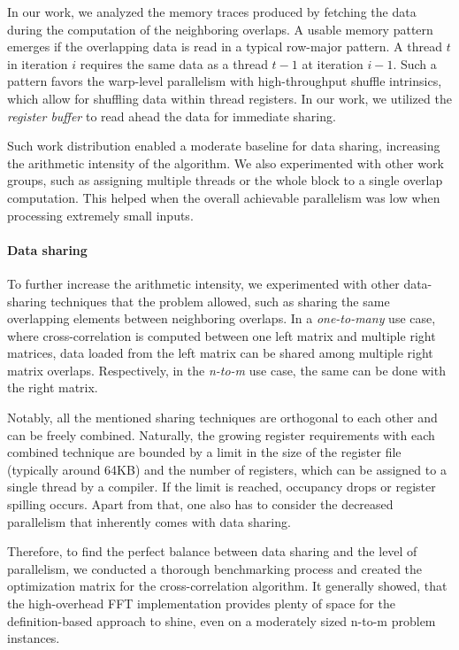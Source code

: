 In our work, we analyzed the memory traces produced by fetching the data during the computation of the neighboring overlaps. A usable memory pattern emerges if the overlapping data is read in a typical row-major pattern. A thread $t$ in iteration $i$ requires the same data as a thread $t-1$ at iteration $i-1$. Such a pattern favors the warp-level parallelism with high-throughput shuffle intrinsics, which allow for shuffling data within thread registers. In our work, we utilized the \emph{register buffer} to read ahead the data for immediate sharing.

Such work distribution enabled a moderate baseline for data sharing, increasing the arithmetic intensity of the algorithm. We also experimented with other work groups, such as assigning multiple threads or the whole block to a single overlap computation. This helped when the overall achievable parallelism was low when processing extremely small inputs.

\paragraph{Data sharing} To further increase the arithmetic intensity, we experimented with other data-sharing techniques that the problem allowed, such as sharing the same overlapping elements between neighboring overlaps. In a \emph{one-to-many} use case, where cross-correlation is computed between one left matrix and multiple right matrices, data loaded from the left matrix can be shared among multiple right matrix overlaps. Respectively, in the \emph{n-to-m} use case, the same can be done with the right matrix. 

Notably, all the mentioned sharing techniques are orthogonal to each other and can be freely combined. Naturally, the growing register requirements with each combined technique are bounded by a limit in the size of the register file (typically around 64KB) and the number of registers, which can be assigned to a single thread by a compiler. If the limit is reached, occupancy drops or register spilling occurs. Apart from that, one also has to consider the decreased parallelism that inherently comes with data sharing.

Therefore, to find the perfect balance between data sharing and the level of parallelism, we conducted a thorough benchmarking process and created the optimization matrix for the cross-correlation algorithm. It generally showed, that the high-overhead FFT implementation provides plenty of space for the definition-based approach to shine, even on a moderately sized n-to-m problem instances.


